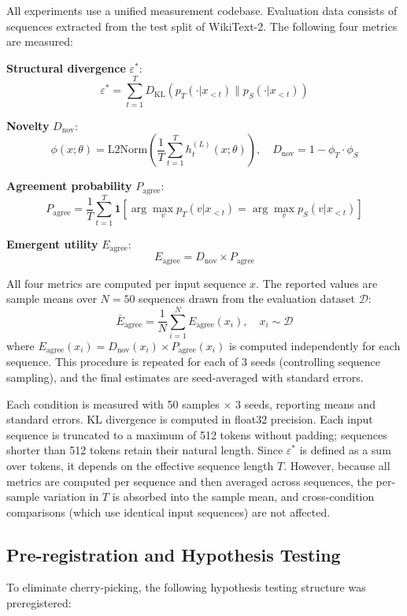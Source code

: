 \documentclass[11pt,a4paper]{article}
\begin{document}
All experiments use a unified measurement codebase. Evaluation data consists of sequences
extracted from the test split of WikiText-2. The following four metrics are measured:

\textbf{Structural divergence} $\varepsilon^*$:
\[
\varepsilon^* = \sum_{t=1}^{T} D_\mathrm{KL}(p_T(\cdot|x_{<t}) \| p_S(\cdot|x_{<t}))
\]

\textbf{Novelty} $D_\mathrm{nov}$:
\[
\phi(x;\theta) = \mathrm{L2Norm}\!\left(\frac{1}{T}\sum_{t=1}^{T}
h_t^{(L)}(x;\theta)\right), \quad D_\mathrm{nov} = 1 - \phi_T \cdot \phi_S
\]

\textbf{Agreement probability} $P_\mathrm{agree}$:
\[
P_\mathrm{agree} = \frac{1}{T}\sum_{t=1}^{T}
\mathbf{1}\!\left[\arg\max_v p_T(v|x_{<t}) = \arg\max_v p_S(v|x_{<t})\right]
\]

\textbf{Emergent utility} $E_\mathrm{agree}$:
\[
E_\mathrm{agree} = D_\mathrm{nov} \times P_\mathrm{agree}
\]

All four metrics are computed per input sequence $x$. The reported values are sample means
over $N=50$ sequences drawn from the evaluation dataset $\mathcal{D}$:
\[
\bar{E}_\mathrm{agree} = \frac{1}{N}\sum_{i=1}^{N} E_\mathrm{agree}(x_i),
\quad x_i \sim \mathcal{D}
\]
where $E_\mathrm{agree}(x_i) = D_\mathrm{nov}(x_i) \times P_\mathrm{agree}(x_i)$ is
computed independently for each sequence. This procedure is repeated for each of 3 seeds
(controlling sequence sampling), and the final estimates are seed-averaged with standard
errors.

Each condition is measured with 50 samples $\times$ 3 seeds, reporting means and standard
errors. KL divergence is computed in float32 precision. Each input sequence is truncated to a
maximum of 512 tokens without padding; sequences shorter than 512 tokens retain their natural
length. Since $\varepsilon^*$ is defined as a sum over tokens, it depends on the effective
sequence length $T$. However, because all metrics are computed per sequence and then averaged
across sequences, the per-sample variation in $T$ is absorbed into the sample mean, and
cross-condition comparisons (which use identical input sequences) are not affected.

\subsection{Pre-registration and Hypothesis Testing}

To eliminate cherry-picking, the following hypothesis testing structure was preregistered:
\end{document}
